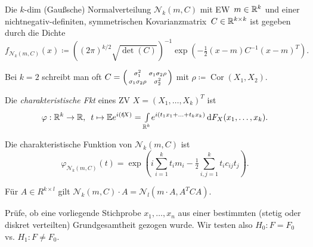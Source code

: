 \documentclass{cheat-sheet}
\newcommand{\E}{\mathbb{E}} %
\newcommand{\scp}[2]{\left( #1 \!\mid\! #2 \right)} %
\DeclareMathOperator{\cor}{Cor} %
\newcommand{\Normal}{\mathcal{N}} %
\begin{document}

\begin{defn}
  Die $k$-dim (Gaußsche) Normalverteilung $\Normal_k(m, C)$ mit EW~$m \in \mathbb{R}^k$ und einer nichtnegativ-definiten, symmetrischen Kovarianzmatrix~$C \in \mathbb{R}^{k \times k}$ ist gegeben durch die Dichte
  \[ f_{\Normal_k(m, C)}(x) \coloneqq \left( (2\pi)^{k/2} \sqrt{\det(C)} \right)^{-1} \exp \left( - \tfrac{1}{2} (x-m) C^{-1} (x-m)^T \right). \]
\end{defn}

\begin{bem}
  Bei $k=2$ schreibt man oft $C = \begin{psmallmatrix}
    \sigma_1^2 & \sigma_1 \sigma_2 \rho \\
    \sigma_1 \sigma_2 \rho & \sigma_2^2
  \end{psmallmatrix}$ mit $\rho \coloneqq \cor(X_1, X_2)$.
\end{bem}

\begin{defn}
  Die \emph{charakteristische Fkt} eines ZV $X = (X_1, \ldots, X_k)^T$ ist
  \[
    \varphi : \R^k \to \R, \enspace
    t \mapsto \E e^{i \scp{t}{X}} = \Int{\R^k}{}{e^{i (t_1 x_1 + \ldots + t_k x_k)}}{F_X(x_1, \ldots, x_k)}.
  \]
\end{defn}

\begin{bem}
  Die charakteristische Funktion von $\Normal_k(m, C)$ ist
  \[ \varphi_{\Normal_k(m, C)}(t) = \exp \left( i \sum_{i=1}^k t_i m_i - \tfrac{1}{2} \sum_{i,j=1}^k t_i c_{ij} t_j \right). \]
\end{bem}

\begin{satz}
  Für $A \in R^{k \times l}$ gilt $\Normal_k(m, C) \cdot A = \Normal_l(m \cdot A, A^T C A)$.
\end{satz}




\begin{aufgabe}
  Prüfe, ob eine vorliegende Stichprobe $x_1, \ldots, x_n$ aus einer bestimmten (stetig oder diskret verteilten) Grundgesamtheit gezogen wurde. Wir testen also $H_0 : F = F_0$ vs. $H_1 : F \neq F_0$.
\end{aufgabe}

\end{document}
